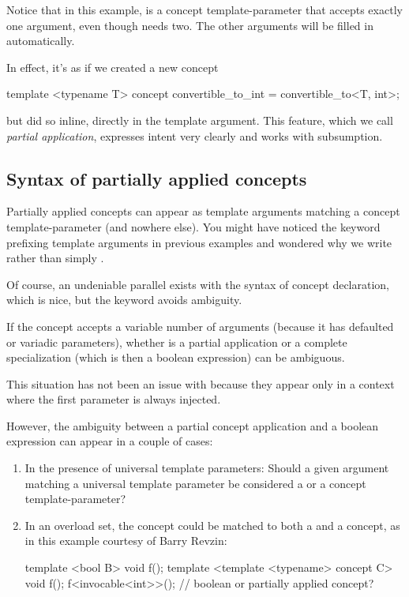 \documentclass{wg21}
\begin{document}
Notice that in this example,  is a concept template-parameter that accepts exactly one argument,
even though  needs two.
The other arguments will be filled in automatically.

In effect, it's as if we created a new concept

\begin{colorblock}
template <typename T>
concept convertible_to_int = convertible_to<T, int>;
\end{colorblock}

but did so inline, directly in the template argument.
This feature, which we call \emph{partial application}, expresses intent very clearly and works with subsumption.

\subsection{Syntax of partially applied concepts}

Partially applied concepts can appear as template arguments matching a concept template-parameter (and nowhere else).
You might have noticed the  keyword prefixing template arguments in previous examples and wondered why we write  rather than simply .

Of course, an undeniable parallel exists with the syntax of concept declaration, which is nice, but the keyword avoids ambiguity.

If the concept accepts a variable number of arguments (because it has defaulted or variadic parameters),
whether  is a partial application or a complete specialization
(which is then a boolean expression) can be ambiguous.

This situation has not been an issue with  because they appear only in a context where the first parameter is always injected.

However, the ambiguity between a partial concept application and a boolean expression can appear in a couple of cases:
\begin{enumerate}
    \item In the presence of universal template parameters: Should a given argument matching a universal template parameter
    be considered a  or a concept template-parameter?
    \item In an overload set, the concept could be matched to both a  and a concept, as in this example courtesy of Barry Revzin:
\begin{colorblock}
template <bool B> void f();
template <template <typename> concept C> void f();
f<invocable<int>>(); // boolean or partially applied concept?
\end{colorblock}
\end{enumerate}
\end{document}
